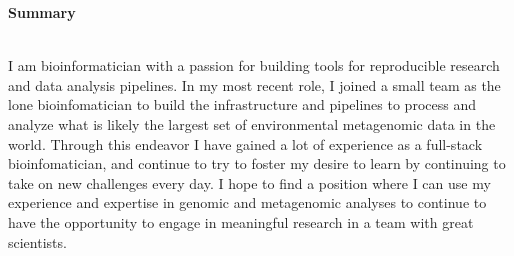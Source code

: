 
{\Large \textbf{Summary}} \\[-0.4cm]
\makebox[\linewidth]{\rule{1.0\textwidth}{0.4pt}} \\
\vspace{0.2cm}

\begin{spacing}{1}
I am bioinformatician with a passion for building tools for reproducible research and data analysis pipelines. In my most recent role, I joined a small team as the lone bioinfomatician to build the infrastructure and pipelines to process and analyze what is likely the largest set of environmental metagenomic data in the world. Through this endeavor I have gained a lot of experience as a full-stack bioinfomatician, and continue to try to foster my desire to learn by continuing to take on new challenges every day. I hope to find a position where I can use my experience and expertise in genomic and metagenomic analyses to continue to have the opportunity to engage in meaningful research in a team with great scientists.
\end{spacing}


